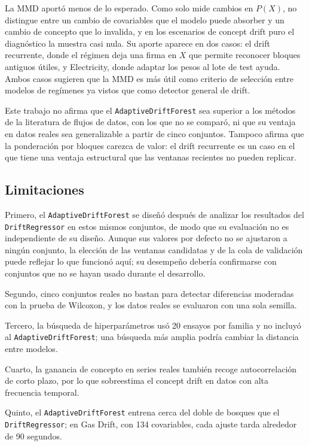 \documentclass[11pt,a4paper]{article}
\begin{document}
La MMD aportó menos de lo esperado. Como solo mide cambios en $P(X)$, no distingue entre un cambio de
covariables que el modelo puede absorber y un cambio de concepto que lo invalida, y en los escenarios
de concept drift puro el diagnóstico la muestra casi nula. Su aporte aparece en dos casos: el drift
recurrente, donde el régimen deja una firma en $X$ que permite reconocer bloques antiguos útiles, y
Electricity, donde adaptar los pesos al lote de test ayuda. Ambos casos sugieren que la MMD es más
útil como criterio de selección entre modelos de regímenes ya vistos que como detector general de
drift.

Este trabajo no afirma que el \texttt{AdaptiveDriftForest} sea superior a los métodos de la
literatura de flujos de datos, con los que no se comparó, ni que su ventaja en datos reales sea
generalizable a partir de cinco conjuntos. Tampoco afirma que la ponderación por bloques carezca de
valor: el drift recurrente es un caso en el que tiene una ventaja estructural que las ventanas
recientes no pueden replicar.

\subsection{Limitaciones}\label{sec:limitaciones}

Primero, el \texttt{AdaptiveDriftForest} se diseñó después de analizar los resultados del
\texttt{DriftRegressor} en estos mismos conjuntos, de modo que su evaluación no es independiente de
su diseño. Aunque sus valores por defecto no se ajustaron a ningún conjunto, la elección de las
ventanas candidatas y de la cola de validación puede reflejar lo que funcionó aquí; su desempeño
debería confirmarse con conjuntos que no se hayan usado durante el desarrollo.

Segundo, cinco conjuntos reales no bastan para detectar diferencias moderadas con la prueba de
Wilcoxon, y los datos reales se evaluaron con una sola semilla.

Tercero, la búsqueda de hiperparámetros usó 20 ensayos por familia y no incluyó al
\texttt{AdaptiveDriftForest}; una búsqueda más amplia podría cambiar la distancia entre modelos.

Cuarto, la ganancia de concepto en series reales también recoge autocorrelación de corto plazo, por
lo que sobreestima el concept drift en datos con alta frecuencia temporal.

Quinto, el \texttt{AdaptiveDriftForest} entrena cerca del doble de bosques que el
\texttt{DriftRegressor}; en Gas Drift, con 134 covariables, cada ajuste tarda alrededor de 90
segundos.
\end{document}
